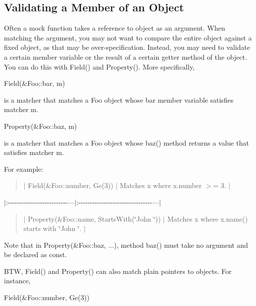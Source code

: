 \subsection*{Validating a Member of an Object}

Often a mock function takes a reference to object as an argument. When matching the argument, you may not want to compare the entire object against a fixed object, as that may be over-\/specification. Instead, you may need to validate a certain member variable or the result of a certain getter method of the object. You can do this with {\ttfamily Field()} and {\ttfamily Property()}. More specifically,


\begin{DoxyCode}
Field(&Foo::bar, m)
\end{DoxyCode}


is a matcher that matches a {\ttfamily Foo} object whose {\ttfamily bar} member variable satisfies matcher {\ttfamily m}.


\begin{DoxyCode}
Property(&Foo::baz, m)
\end{DoxyCode}


is a matcher that matches a {\ttfamily Foo} object whose {\ttfamily baz()} method returns a value that satisfies matcher {\ttfamily m}.

For example\+:

\begin{quote}
$\vert$ {\ttfamily Field(\&\+Foo\+::number, Ge(3))} $\vert$ Matches {\ttfamily x} where {\ttfamily x.\+number $>$= 3}. $\vert$ \end{quote}
$\vert$\+:-\/-\/-\/-\/-\/-\/-\/-\/-\/-\/-\/-\/-\/-\/-\/-\/-\/-\/-\/-\/-\/-\/-\/-\/-\/-\/---$\vert$\+:-\/-\/-\/-\/-\/-\/-\/-\/-\/-\/-\/-\/-\/-\/-\/-\/-\/-\/-\/-\/-\/-\/-\/-\/-\/-\/-\/-\/-\/-\/-\/-\/---$\vert$ \begin{quote}
$\vert$ {\ttfamily Property(\&Foo\+::name, Starts\+With(\char`\"{}\+John \char`\"{}))} $\vert$ Matches {\ttfamily x} where {\ttfamily x.\+name()} starts with {\ttfamily \char`\"{}\+John \char`\"{}}. $\vert$ \end{quote}


Note that in {\ttfamily Property(\&Foo\+::baz, ...)}, method {\ttfamily baz()} must take no argument and be declared as {\ttfamily const}.

B\+TW, {\ttfamily Field()} and {\ttfamily Property()} can also match plain pointers to objects. For instance,


\begin{DoxyCode}
Field(&Foo::number, Ge(3))
\end{DoxyCode}


